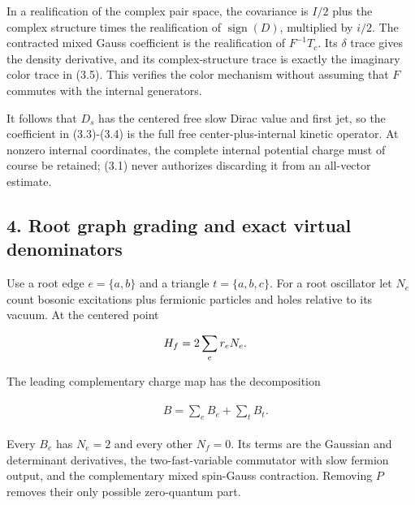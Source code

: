 In a realification of the complex pair space, the covariance is \(I/2\)
plus the complex structure times the realification of
\(\operatorname{sign} (D)\), multiplied by \(i/2\). The contracted mixed
Gauss coefficient is the realification of \(F^{-1} T_{c}\). Its
\(\delta\) trace gives the density derivative, and its complex-structure
trace is exactly the imaginary color trace in (3.5). This verifies the
color mechanism without assuming that \(F\) commutes with the internal
generators.

It follows that \(D_{s}\) has the centered free slow Dirac value and
first jet, so the coefficient in (3.3)-(3.4) is the full free
center-plus-internal kinetic operator. At nonzero internal coordinates,
the complete internal potential charge must of course be retained; (3.1)
never authorizes discarding it from an all-vector estimate.

\subsection{4. Root graph grading and exact virtual
denominators}\label{c-root-graph-grading-and-exact-virtual-denominators}

Use a root edge \(e=\{a,b\}\) and a triangle \(t=\{a,b,c\}\). For a root
oscillator let \(N_{e}\) count bosonic excitations plus fermionic
particles and holes relative to its vacuum. At the centered point

\begin{gather*}
\begin{aligned}
& H_{f} = 2 \sum _{e} r_{e} N_{e}.
\end{aligned}\notag
\end{gather*}

The leading complementary charge map has the decomposition

\begin{gather*}
\begin{aligned}
& B = \sum _{e} B_{e} + \sum _{t} B_{t}.
\end{aligned}\tag{4.1}
\end{gather*}

Every \(B_{e}\) has \(N_{e}=2\) and every other \(N_{f}=0\). Its terms
are the Gaussian and determinant derivatives, the two-fast-variable
commutator with slow fermion output, and the complementary mixed
spin-Gauss contraction. Removing \(P\) removes their only possible
zero-quantum part.

